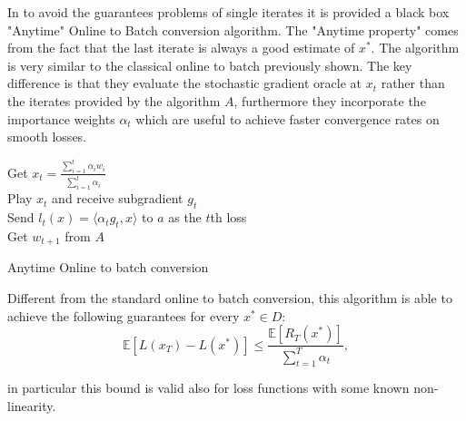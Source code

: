\documentclass[12pt]{article}
\theoremstyle{definition}
\begin{document}
In \cite{cutkosky} to avoid the guarantees problems of single iterates it is provided a black box "Anytime" Online to Batch conversion algorithm. The "Anytime property" comes from the fact that the last iterate is always a good estimate of $x^*$. The algorithm is very similar to the classical online to batch previously shown. The key difference is that they evaluate the stochastic gradient oracle at $x_t$ rather than the iterates provided by the algorithm $A$, furthermore they incorporate the importance weights $\alpha_t$ which are useful to achieve faster convergence rates on smooth losses. 

\begin{algorithm}

      {
		Get $x_t = \frac{\sum_{i=1}^t \alpha_i w_i}{\sum_{i=1}^t \alpha_i} $ \\
		Play $x_t$ and receive subgradient $g_t$ \\
		Send $l_t(x) = \langle \alpha_t g_t,x\rangle$ to $a$ as the $t$th loss \\
		Get $w_{t+1}$ from $A$
      }
    \caption{Anytime Online to batch conversion }
    \label{alg:anytime}
\end{algorithm}

Different from the standard online to batch conversion, this algorithm is able to achieve the following guarantees for every $x^* \in D$:
$$
\mathbb{E}[L(x_T) - L(x^*)] \leq \frac{\mathbb{E}[R_T(x^*)]}{\sum_{t=1}^T \alpha_t}, 
$$ 

in particular this bound is valid also for loss functions with some known non-linearity. 

 

\end{document}
